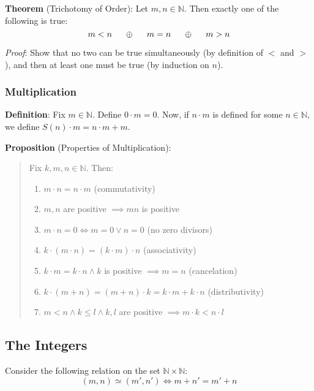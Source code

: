 \documentclass[11pt]{article}
\begin{document}
\textbf{Theorem} (Trichotomy of Order): Let $m, n \in \mathbb{N}$. Then exactly one of the following is true:
\begin{displaymath}
	m < n \hspace{0.5cm} \oplus \hspace{0.5cm} m = n \hspace{0.5cm} \oplus \hspace{0.5cm} m > n
\end{displaymath}

\emph{Proof}: Show that no two can be true simultaneously (by definition of $<$ and $>$), and then at least one must be true (by induction on $n$).

\subsubsection{Multiplication}

\textbf{Definition}: Fix $m \in \mathbb{N}$. Define $0 \cdot m = 0$. Now, if $n \cdot m$ is defined for some $n \in \mathbb{N}$, we define $S(n) \cdot m = n \cdot m + m$.

\textbf{Proposition} (Properties of Multiplication):
\begin{quote}\vspace{-0.3cm}
	Fix $k,m,n \in \mathbb{N}$. Then:
	\begin{enumerate}
	\item $m \cdot n = n \cdot m$ (commutativity)
	\item $m,n$ are positive $\implies mn$ is positive
	\item $m \cdot n = 0 \iff m = 0 \lor n = 0$ (no zero divisors)
	\item $k \cdot (m \cdot n) = (k \cdot m) \cdot n$ (associativity)
	\item $k \cdot m = k \cdot n \land k$ is positive $\implies m = n$ (cancelation)
	\item $k \cdot (m + n) = (m + n) \cdot k = k \cdot m + k \cdot n$ (distributivity)
	\item $m < n \land k \leq l \land k,l$ are positive $\implies m \cdot k < n \cdot l$
	\end{enumerate}
\end{quote}

\subsection{The Integers}

Consider the following relation on the set $\mathbb{N} \times \mathbb{N}$:
\begin{displaymath}
	(m,n) \simeq (m', n') \iff m + n' = m' + n
\end{displaymath}
\end{document}
